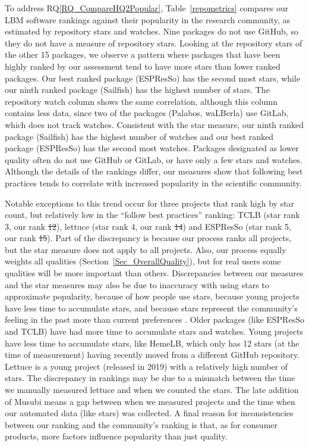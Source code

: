 \documentclass[final, 3p, times, authoryear]{elsarticle}
\newcommand{\esp}{ESPResSo\nolinebreak\hspace{-.05em}\raisebox{.4ex}{\small\bf
+}\nolinebreak\hspace{-.10em}\raisebox{.4ex}{\small\bf +}}
\newcommand{\rqref}[1]{RQ\ref{#1}}
\providecommand{\DIFaddtex}[1]{{\protect\color{blue}\uwave{#1}}} %
\providecommand{\DIFdeltex}[1]{{\protect\color{red}\sout{#1}}}                      %
\providecommand{\DIFaddbegin}{} %
\providecommand{\DIFaddend}{} %
\providecommand{\DIFdelbegin}{} %
\providecommand{\DIFdelend}{} %
\providecommand{\DIFadd}[1]{\texorpdfstring{\DIFaddtex{#1}}{#1}} %
\providecommand{\DIFdel}[1]{\texorpdfstring{\DIFdeltex{#1}}{}} %
\begin{document}
To address \rqref{RQ_CompareHQ2Popular}, Table~\ref{repometrics} compares our
LBM software rankings against their popularity in the research community, as
estimated by repository stars and watches. Nine packages do not use GitHub, so
they do not have a measure of repository stars. Looking at the repository stars
of the other 15 packages, we observe a pattern where packages that have been
highly ranked by our assessment tend to have more stars than lower ranked
packages. Our best ranked package (ESPResSo) has the second most stars, while
our ninth ranked package (Sailfish) has the highest number of stars. The
repository watch column shows the same correlation, although this column
contains less data, since two of the packages (Palabos, waLBerla) use GitLab,
which does not track watches. Consistent with the star measure, our ninth ranked
package (Sailfish) has the highest number of watches and our best ranked package
(ESPResSo) has the second most watches. Packages designated as lower quality
often do not use GitHub or GitLab, or have only a few stars and watches.
Although the details of the rankings differ, our measures show that following
best practices tends to correlate with increased popularity in the scientific
community.

Notable exceptions to this trend occur for three projects that rank high by star
count, but relatively low in the ``follow best practices'' ranking: TCLB (star
rank 3, our rank \DIFdelbegin \DIFdel{12}\DIFdelend \DIFaddbegin \DIFadd{10}\DIFaddend ), lettuce (star rank 4, our rank \DIFdelbegin \DIFdel{14}\DIFdelend \DIFaddbegin \DIFadd{12}\DIFaddend ) and \esp{} (star rank
5, our rank \DIFdelbegin \DIFdel{15}\DIFdelend \DIFaddbegin \DIFadd{14}\DIFaddend ).  Part of the discrepancy is because our process ranks all
projects, but the star measure does not apply to all projects.  Also, our
process equally weights all qualities (Section~\ref{Sec_OverallQuality}), but
for real users some qualities will be more important than others. Discrepancies
between our measures and the star measures may also be due to inaccuracy with
using stars to approximate popularity, because of how people use stars, because
young projects have less time to accumulate stars, and because stars represent
the community's feeling in the past more than current preferences
\citep{Szulik2017}. Older packages (like \esp{} and TCLB) have had more time to
accumulate stars and watches. Young projects have less time to accumulate stars,
like HemeLB, which only has 12 stars (at the time of measurement) having
recently moved from a different GitHub repository.  Lettuce is a young project
(released in 2019) with a relatively high number of stars. The discrepancy in
rankings may be due to a mismatch between the time we manually measured lettuce
and when we counted the stars. The late addition of Musubi means a gap between
when we measured projects and the time when our automated data (like stars) was
collected. A final reason for inconsistencies between our ranking and the
community's ranking is that, as for consumer products, more factors influence
popularity than just quality.
\end{document}
